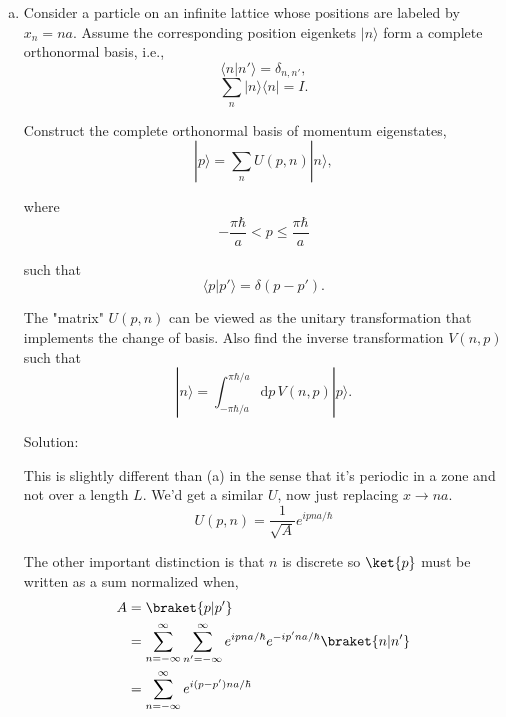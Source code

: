 \begin{homeworkProblem}
\begin{enumerate}[(a)]
\begin{callout}{Solution:}
                And this vanishes when:
                \begin{align*}
                    \frac{(p_k-p_k')L}{2\hbar} = n\pi
                \end{align*}

                so, 
                \begin{align*}
                    p_k-p_k' = \frac{2\pi\hbar n}{L}
                \end{align*}

                In summary,
                $$\boxed{U(p_k, x) = \frac{1}{\sqrt{L}} e^{ip_k x / \hbar}, \qquad V(p_k, x) = U(p_k, x)^* = \frac{1}{\sqrt{L}} e^{-ip_k x / \hbar}}$$


            \end{callout}

        \item Consider a particle on an infinite lattice whose positions are labeled by $x_n=na$. Assume the corresponding position eigenkets $|n\rangle$ form a complete orthonormal basis, i.e.,
            \[ \langle n|n'\rangle = \delta_{n,n'}, \]
            \[ \sum_n |n\rangle\langle n| = I. \]

            Construct the complete orthonormal basis of momentum eigenstates,
            \[ |p\rangle = \sum_n U(p,n)|n\rangle, \]

            where
            \[ -\frac{\pi\hbar}{a} < p \leq \frac{\pi\hbar}{a} \]

            such that
            \[ \langle p|p'\rangle = \delta(p-p'). \]

            The "matrix" $U(p,n)$ can be viewed as the unitary transformation that implements the change of basis. Also find the inverse transformation $V(n,p)$ such that
            \[ |n\rangle = \int_{-\pi\hbar/a}^{\pi\hbar/a} \mathrm{d}p\, V(n,p)|p\rangle. \]
            \begin{callout}{Solution:}

                This is slightly different than (a) in the sense that it's periodic in a zone and not over a length $L$. We'd get a similar $U$, now just replacing $x\to n a$. 
                $$\boxed{U(p, n) = \frac{1}{\sqrt{A}} e^{ip n a / \hbar}}$$

           The other important distinction is that $n$ is discrete so $\ket{p}$ must be written as a sum normalized when,
                \begin{align*}
                    A &= \braket{p|p'} \\
                      &= \sum_{n=-\infty}^{\infty} \sum_{n'=-\infty}^{\infty}
                    e^{ip n a / \hbar} e^{-ip' n a / \hbar} \braket{n|n'} \\
                    &= \sum_{n=-\infty}^{\infty} 
                    e^{i (p-p') n a / \hbar}
                \end{align*}


\end{callout}
\end{enumerate}
\end{homeworkProblem}
